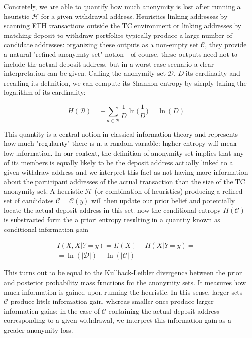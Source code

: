 Concretely, we are able to quantify how much anonymity is lost after running a heuristic $\mathcal{H}$ for a given withdrawal address. Heuristics linking addresses by scanning ETH transactions outside the TC environment or linking addresses by matching deposit to withdraw portfolios typically produce a large number of candidate addresses: organizing these outputs as a non-empty set $\mathcal{C}$, they provide a natural "refined anonymity set" notion - of course, these outputs need not to include the actual deposit address, but in a worst-case scenario a clear interpretation can be given. Calling the anonymity set $\mathcal{D}$, $D$ its cardinality and recalling its definition, we can compute its Shannon entropy by simply taking the logarithm of its cardinality:

\begin{equation*}
H(\mathcal{D})=-\sum\limits_{d\in\mathcal{D}}{\frac{1}{D}\ln\Big(\frac{1}{D}\Big)}=\ln(D)
\end{equation*} 

This quantity is a central notion in classical information theory and represents how much "regularity" there is in a random variable: higher entropy will mean low information. In our context, the definition of anonymity set implies that any of its members is equally likely to be the deposit address actually linked to a given withdraw address and we interpret this fact as not having more information about the participant addresses of the actual transaction than the size of the TC anonymity set. A heuristic $\mathcal{H}$ (or combination of heuristics) producing a refined set of candidates $\mathcal{C}=\mathcal{C}(y)$ will then update our prior belief and potentially locate the actual deposit address in this set: now the conditional entropy $H(\mathcal{C})$ is substracted form the a priori entropy resulting in a quantity known as conditional information gain

\begin{equation*} 
\begin{aligned}
  I(X,X|Y=y)=H(X)-H(X|Y=y)=\\ =\ln(\lvert \mathcal{D}\rvert)-\ln(\lvert \mathcal{C}\rvert)
\end{aligned}
\end{equation*}

 This turns out to be equal to the Kullback-Leibler divergence between the prior and posterior probability mass functions for the anonymity sets. It measures how much information is gained upon running the heuristic. In this sense, larger sets $\mathcal{C}$ produce little information gain, whereas smaller ones produce larger information gains: in the case of $\mathcal{C}$ containing the actual deposit address corresponding to a given withdrawal, we interpret this information gain as a greater anonymity loss.